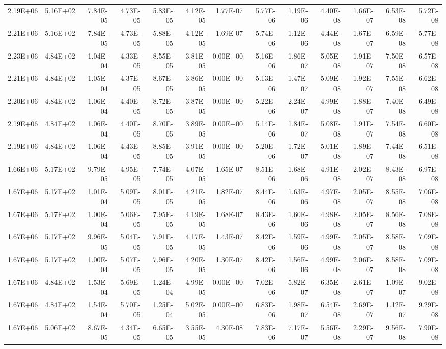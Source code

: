 \begin{tabular}{rrrrrrrrrrrrr}
2.19E+06 & 5.16E+02 & 7.84E-05 & 4.73E-05 & 5.83E-05 & 4.12E-05 & 1.77E-07 & 5.77E-06 & 1.19E-06 & 4.40E-08 & 1.66E-07 & 6.53E-08 & 5.72E-08 \\
2.21E+06 & 5.16E+02 & 7.84E-05 & 4.73E-05 & 5.88E-05 & 4.12E-05 & 1.69E-07 & 5.74E-06 & 1.12E-06 & 4.44E-08 & 1.67E-07 & 6.59E-08 & 5.77E-08 \\
2.23E+06 & 4.84E+02 & 1.04E-04 & 4.33E-05 & 8.55E-05 & 3.81E-05 & 0.00E+00 & 5.16E-06 & 1.86E-07 & 5.05E-08 & 1.91E-07 & 7.50E-08 & 6.57E-08 \\
2.21E+06 & 4.84E+02 & 1.05E-04 & 4.37E-05 & 8.67E-05 & 3.86E-05 & 0.00E+00 & 5.13E-06 & 1.47E-07 & 5.09E-08 & 1.92E-07 & 7.55E-08 & 6.62E-08 \\
2.20E+06 & 4.84E+02 & 1.06E-04 & 4.40E-05 & 8.72E-05 & 3.87E-05 & 0.00E+00 & 5.22E-06 & 2.24E-07 & 4.99E-08 & 1.88E-07 & 7.40E-08 & 6.49E-08 \\
2.19E+06 & 4.84E+02 & 1.06E-04 & 4.40E-05 & 8.70E-05 & 3.89E-05 & 0.00E+00 & 5.14E-06 & 1.84E-07 & 5.08E-08 & 1.91E-07 & 7.54E-08 & 6.60E-08 \\
2.19E+06 & 4.84E+02 & 1.06E-04 & 4.43E-05 & 8.85E-05 & 3.91E-05 & 0.00E+00 & 5.20E-06 & 1.72E-07 & 5.01E-08 & 1.89E-07 & 7.44E-08 & 6.51E-08 \\
1.66E+06 & 5.17E+02 & 9.79E-05 & 4.95E-05 & 7.74E-05 & 4.07E-05 & 1.65E-07 & 8.51E-06 & 1.68E-06 & 4.91E-08 & 2.02E-07 & 8.43E-08 & 6.97E-08 \\
1.67E+06 & 5.17E+02 & 1.01E-04 & 5.09E-05 & 8.01E-05 & 4.21E-05 & 1.82E-07 & 8.44E-06 & 1.63E-06 & 4.97E-08 & 2.05E-07 & 8.55E-08 & 7.06E-08 \\
1.67E+06 & 5.17E+02 & 1.00E-04 & 5.06E-05 & 7.95E-05 & 4.19E-05 & 1.68E-07 & 8.43E-06 & 1.60E-06 & 4.98E-08 & 2.05E-07 & 8.56E-08 & 7.08E-08 \\
1.67E+06 & 5.17E+02 & 9.96E-05 & 5.04E-05 & 7.91E-05 & 4.17E-05 & 1.43E-07 & 8.42E-06 & 1.59E-06 & 4.99E-08 & 2.05E-07 & 8.58E-08 & 7.09E-08 \\
1.67E+06 & 5.17E+02 & 1.00E-04 & 5.07E-05 & 7.96E-05 & 4.20E-05 & 1.30E-07 & 8.42E-06 & 1.56E-06 & 4.99E-08 & 2.06E-07 & 8.58E-08 & 7.09E-08 \\
1.67E+06 & 4.84E+02 & 1.53E-04 & 5.69E-05 & 1.24E-04 & 4.99E-05 & 0.00E+00 & 7.02E-06 & 5.82E-07 & 6.35E-08 & 2.61E-07 & 1.09E-07 & 9.02E-08 \\
1.67E+06 & 4.84E+02 & 1.54E-04 & 5.70E-05 & 1.25E-04 & 5.02E-05 & 0.00E+00 & 6.83E-06 & 1.98E-07 & 6.54E-08 & 2.69E-07 & 1.12E-07 & 9.29E-08 \\
1.67E+06 & 5.06E+02 & 8.67E-05 & 4.34E-05 & 6.65E-05 & 3.55E-05 & 4.30E-08 & 7.83E-06 & 7.17E-07 & 5.56E-08 & 2.29E-07 & 9.56E-08 & 7.90E-08 \\

\end{tabular}
